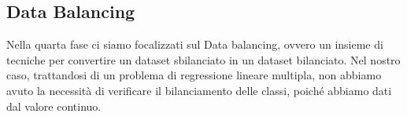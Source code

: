 \newpage
\subsection{Data Balancing}

Nella quarta fase ci siamo focalizzati sul Data balancing, ovvero un insieme di tecniche per convertire un dataset sbilanciato in un dataset bilanciato. Nel nostro caso, trattandosi di un problema di regressione lineare multipla, non abbiamo avuto la necessità di verificare il bilanciamento delle classi, poiché abbiamo dati dal valore continuo.


